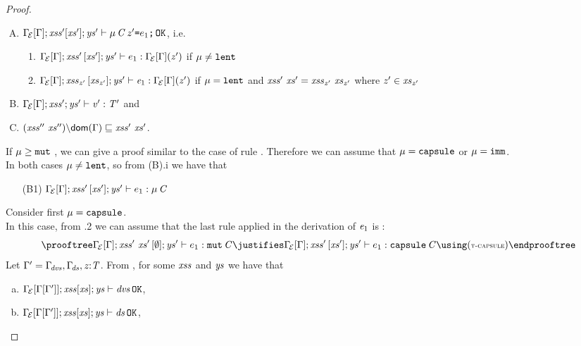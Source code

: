 {\begin{proof}
\begin{enumerate} [(A)]
\item ${\Gamma_{\!{\cal{E}}}[\Gamma]};\mathit{xss}'[\mathit{xs}'];\mathit{ys}'\vdash \mu\,\mathit{C}\,\mathit{z}'\texttt{=}e_1\texttt{;}\,{\tt OK}$, i.e.
\begin{enumerate}[i]
\item ${\Gamma_{\!{\cal{E}}}[\Gamma]};\mathit{xss}'\,[\mathit{xs}'];\mathit{ys}'\vdash e_1:{\Gamma_{\!{\cal{E}}}[\Gamma]}(\mathit{z}')$ if $\mu\neq\texttt{lent}$
\item ${\Gamma_{\!{\cal{E}}}[\Gamma]};\mathit{xss}_{\mathit{z}'}\,[\mathit{xs}_{\mathit{z}'}];\mathit{ys}'\vdash \mathit{e}_1:{\Gamma_{\!{\cal{E}}}[\Gamma]}(\mathit{z}')$ if $\mu=\texttt{lent}$ and $\LentLocked'\ \xs'=\LentLocked_{\z'}\ \xs_{\z'}$ where $\mathit{z}'\in\mathit{xs}_{\mathit{z}'}$
\end{enumerate}
\item $\Gamma_{\!{\cal{E}}}[\Gamma];\mathit{xss}';\mathit{ys}'\vdash \mathit{v}':\mathit{T}'$ and
\item $\LessEq{(\LentLocked''\ \xs''){\setminus}\dom{\Gamma}}{\LentLocked'\ \xs'}$.
\end{enumerate}
If \underline{$\mu\geq\texttt{mut}$} , we can give a proof similar to the 
case of {rule }. Therefore we can assume that $\mu=\texttt{capsule}$
or $\mu=\texttt{imm}$. \\
In both cases $\mu\neq\texttt{lent}$, so from (B).i we have that
\begin{itemize}
\item [(B1)] ${\Gamma_{\!{\cal{E}}}[\Gamma]};\mathit{xss}'\,[\mathit{xs}'];\mathit{ys}'\vdash e_1:\mu\,\mathit{C}$
\end{itemize}
Consider first \underline{$\mu=\texttt{capsule}$}. \\
In this case, from .2 we can assume that the last rule applied in the derivation of $\mathit{e}_1$ is
:
\[
\prooftree
\AuxTypeCheck{{\SubstFun{\TypeEnv{\ctx}}{\Gamma}}}{\LentLocked'\ \xs'}{\emptyset}{\StronglyLocked'}{e_1}{\Type{\mutable}{\C}}
\justifies
\AuxTypeCheck{{\SubstFun{\TypeEnv{\ctx}}{\Gamma}}}{\LentLocked'}{\MutGroup'}{\StronglyLocked'}{e_1}{\Type{\capsule}{\C}}
\using
\rn{t-capsule}
\endprooftree
\]
Let $\Gamma'=\Gamma_{\!\mathit{dvs}},\Gamma_{\!\mathit{ds}},\mathit{z}{:}\mathit{T}$. From , for some $\mathit{xss}$ and $\mathit{ys}$
we have that
\begin{enumerate} [(a)]
\item ${\Gamma_{\!{\cal{E}}}[\Gamma[\Gamma']]};\mathit{xss}[\mathit{xs}];\mathit{ys}\vdash \mathit{dvs}\,{\tt OK}$,
\item ${\Gamma_{\!{\cal{E}}}[\Gamma[\Gamma']]};\mathit{xss}[\mathit{xs}];\mathit{ys}\vdash \mathit{ds}\,{\tt OK}$,

\end{enumerate}
\end{proof}}
